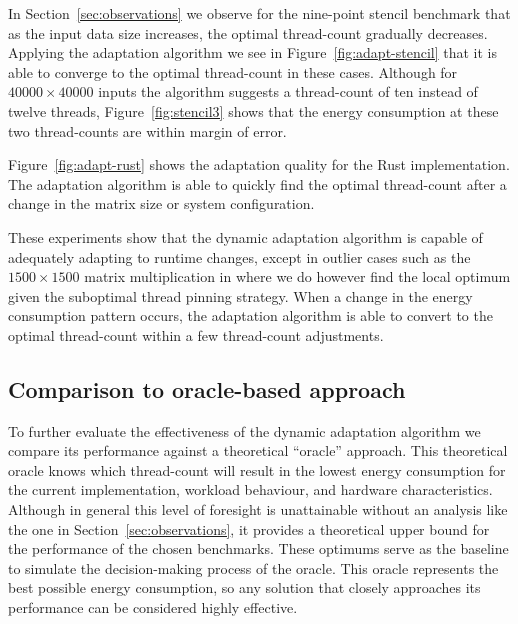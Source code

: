 In Section~\ref{sec:observations} we observe for the nine-point stencil benchmark that as the input data size increases, the optimal thread-count gradually decreases.
Applying the adaptation algorithm we see in Figure~\ref{fig:adapt-stencil} that it is able to converge to the optimal thread-count in these cases.
Although for $40000 \times 40000$ inputs the algorithm suggests a thread-count of ten instead of twelve threads, Figure~\ref{fig:stencil3} shows that the energy consumption at these two thread-counts are within margin of error.

Figure~\ref{fig:adapt-rust} shows the adaptation quality for the Rust implementation.
The adaptation algorithm is able to quickly find the optimal thread-count after a change in the matrix size or system configuration.

These experiments show that the dynamic adaptation algorithm is capable of adequately adapting to runtime changes, except in outlier cases such as the $1500 \times 1500$ matrix multiplication in \sac{} where we do however find the local optimum given the suboptimal thread pinning strategy.
When a change in the energy consumption pattern occurs, the adaptation algorithm is able to convert to the optimal thread-count within a few thread-count adjustments.

\subsection{Comparison to oracle-based approach}\label{sec:evalation-oracle}

To further evaluate the effectiveness of the dynamic adaptation algorithm we compare its performance against a theoretical ``oracle'' approach.
This theoretical oracle knows which thread-count will result in the lowest energy consumption for the current implementation, workload behaviour, and hardware characteristics.
Although in general this level of foresight is unattainable without an analysis like the one in Section~\ref{sec:observations}, it provides a theoretical upper bound for the performance of the chosen benchmarks.
These optimums serve as the baseline to simulate the decision-making process of the oracle.
This oracle represents the best possible energy consumption, so any solution that closely approaches its performance can be considered highly effective.

